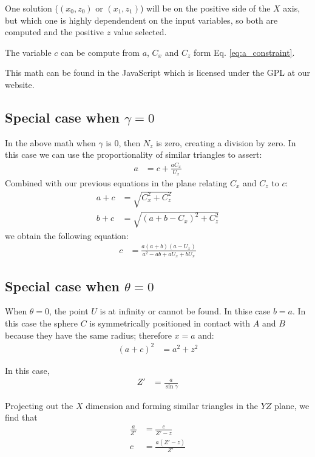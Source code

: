 \documentclass{article}
\begin{document}
One solution ($(x_0,z_0)$ or $(x_1,z_1)$) will be on the
positive side of the $X$ axis, but which one is highly dependendent
on the input variables, so both are computed and the positive $z$
value selected.

The variable $c$ can be compute from $a$, $C_x$ and $C_z$
form Eq. \ref{eq:a_constraint}.

This math can be found in the JavaScript which is licensed
under the GPL\cite{gplv3} at our website\cite{softrobotcalc}.

\subsection{Special case when $\gamma = 0$}

In the above math when $\gamma$ is $0$, then $N_z$ is zero,
creating a division by zero.
In this case we can use the proportionality of similar
triangles to assert:
\begin{align}
  a &= c + \frac{a C_x}{U_x}
\end{align}
Combined with our previous equations in the plane
relating $C_x$ and $C_z$ to $c$:
\begin{align}
  a + c &= \sqrt{C_x^2 + C_z^2} \\
  b + c &= \sqrt{(a+b-C_x)^2 + C_z^2}
\end{align}
we obtain the following equation:
\begin{align}
c & = \frac{a (a + b) (a - U_x)}{a^2 - a b + a U_x + b U_x}
\end{align}


\subsection{Special case when $\theta = 0$}

When $\theta = 0$, the point $U$ is at infinity or
cannot be found. In thise case $b = a$.
In this case the sphere $C$ is symmetrically
positioned in contact with $A$ and $B$ because
they have the same radius; therefore $x = a$ and:
\begin{align}
(a + c)^2 &= a^2 + z^2
\end{align}

In this case,
\begin{align}
Z' &= \frac{a}{\sin{\gamma}}
\end{align}

Projecting out the $X$ dimension and forming
similar triangles in the $YZ$ plane, we find that
\begin{align}
  \frac{a}{Z'} &= \frac{c}{Z'-z} \\
  c &= \frac{a( Z' -z )}{Z'} \label{eqn:cthetazero}
\end{align}
\end{document}
